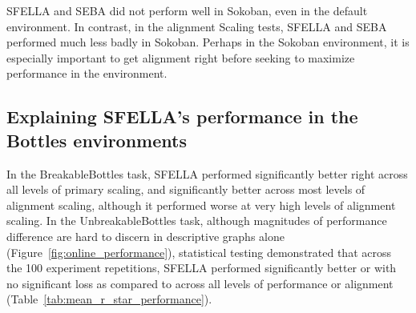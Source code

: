 SFELLA and SEBA did not perform well in Sokoban, even in the default environment. In contrast, in the alignment Scaling tests, SFELLA and SEBA performed much less badly in Sokoban. Perhaps in the Sokoban environment, it is especially important to get alignment right before seeking to maximize performance in the environment.

\subsection{Explaining SFELLA's performance in the Bottles environments}


In the BreakableBottles task, SFELLA performed significantly better right across all levels of primary scaling, and significantly better across most levels of alignment scaling, although it performed worse at very high levels of alignment scaling. In the UnbreakableBottles task, although magnitudes of performance difference are hard to discern in descriptive graphs alone (Figure~\ref{fig:online_performance}), statistical testing demonstrated that across the 100 experiment repetitions, SFELLA performed significantly better or with no significant loss as compared to  \tloA{} across all levels of performance or alignment (Table~\ref{tab:mean_r_star_performance}).



